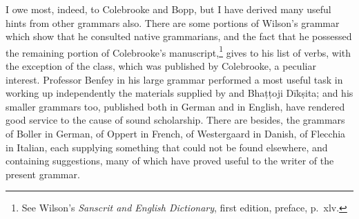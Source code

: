 I owe most, indeed, to Colebrooke and Bopp, but I have derived many
useful hints from other grammars also. There are some portions of
Wilson's grammar which show that he consulted native grammarians, and
the fact that he possessed the remaining portion of Colebrooke's
manuscript,\footnote{See Wilson's \emph{Sanscrit and English
    Dictionary}, first edition, preface, p.\ xlv.} gives to his list of
verbs, with the exception of the  class, which was published by
Colebrooke, a peculiar interest. Professor Benfey in his large grammar
performed a most useful task in working up independently the materials
supplied by \panini{} and Bhaṭṭoji Dīkṣita; and his smaller grammars
too, published both in German and in English, have rendered good service
to the cause of sound scholarship. There are besides, the grammars of
Boller in German, of Oppert in French, of Westergaard in Danish, of
Flecchia in Italian, each supplying something that could not be found
elsewhere, and containing suggestions, many of which have proved useful
to the writer of the present grammar.

